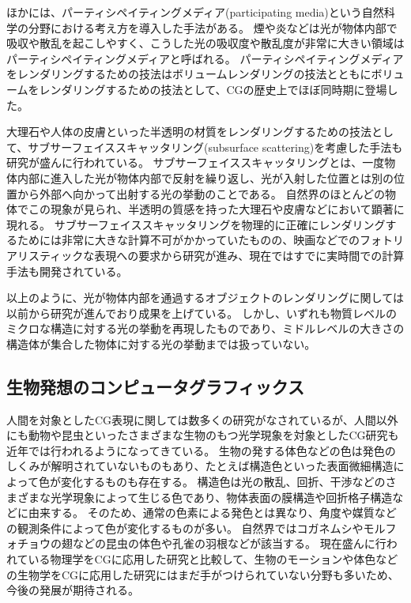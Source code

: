 ほかには、パーティシペイティングメディア(participating media)という自然科学の分野における考え方を導入した手法がある。
煙や炎などは光が物体内部で吸収や散乱を起こしやすく、こうした光の吸収度や散乱度が非常に大きい領域はパーティシペイティングメディアと呼ばれる。
パーティシペイティングメディアをレンダリングするための技法はボリュームレンダリングの技法とともにボリュームをレンダリングするための技法として、CGの歴史上でほぼ同時期に登場した\cite{}。

大理石や人体の皮膚といった半透明の材質をレンダリングするための技法として、サブサーフェイススキャッタリング(subsurface scattering)を考慮した手法も研究が盛んに行われている。
サブサーフェイススキャッタリングとは、一度物体内部に進入した光が物体内部で反射を繰り返し、光が入射した位置とは別の位置から外部へ向かって出射する光の挙動のことである。
自然界のほとんどの物体でこの現象が見られ、半透明の質感を持った大理石や皮膚などにおいて顕著に現れる。
サブサーフェイススキャッタリングを物理的に正確にレンダリングするためには非常に大きな計算不可がかかっていたものの、映画などでのフォトリアリスティックな表現への要求から研究が進み、現在ではすでに実時間での計算手法も開発されている\cite{jorge jimenez}。

以上のように、光が物体内部を通過するオブジェクトのレンダリングに関しては以前から研究が進んでおり成果を上げている。
しかし、いずれも物質レベルのミクロな構造に対する光の挙動を再現したものであり、ミドルレベルの大きさの構造体が集合した物体に対する光の挙動までは扱っていない。

\subsection{生物発想のコンピュータグラフィックス}

人間を対象としたCG表現に関しては数多くの研究がなされているが、人間以外にも動物や昆虫といったさまざまな生物のもつ光学現象を対象としたCG研究も近年では行われるようになってきている。
生物の発する体色などの色は発色のしくみが解明されていないものもあり、たとえば構造色といった表面微細構造によって色が変化するものも存在する。
構造色は光の散乱、回折、干渉などのさまざまな光学現象によって生じる色であり、物体表面の膜構造や回折格子構造などに由来する。
そのため、通常の色素による発色とは異なり、角度や媒質などの観測条件によって色が変化するものが多い。
自然界ではコガネムシやモルフォチョウの翅などの昆虫の体色や孔雀の羽根などが該当する。
現在盛んに行われている物理学をCGに応用した研究と比較して、生物のモーションや体色などの生物学をCGに応用した研究にはまだ手がつけられていない分野も多いため、今後の発展が期待される。


